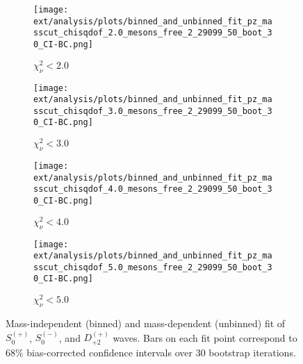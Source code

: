 \begin{figure}[htbp]
    \centering
    \begin{subfigure}{0.45\textwidth}
        \texttt{[image: ext/analysis/plots/binned\_and\_unbinned\_fit\_pz\_masscut\_chisqdof\_2.0\_mesons\_free\_2\_29099\_50\_boot\_30\_CI-BC.png]}
        \caption{$\chi^2_\nu < 2.0$}
    \end{subfigure}
    \hfill
    \begin{subfigure}{0.45\textwidth}
        \texttt{[image: ext/analysis/plots/binned\_and\_unbinned\_fit\_pz\_masscut\_chisqdof\_3.0\_mesons\_free\_2\_29099\_50\_boot\_30\_CI-BC.png]}
        \caption{$\chi^2_\nu < 3.0$}
    \end{subfigure}
    \vspace{1em}
    \begin{subfigure}{0.45\textwidth}
        \texttt{[image: ext/analysis/plots/binned\_and\_unbinned\_fit\_pz\_masscut\_chisqdof\_4.0\_mesons\_free\_2\_29099\_50\_boot\_30\_CI-BC.png]}
        \caption{$\chi^2_\nu < 4.0$}
    \end{subfigure}
    \hfill
    \begin{subfigure}{0.45\textwidth}
        \texttt{[image: ext/analysis/plots/binned\_and\_unbinned\_fit\_pz\_masscut\_chisqdof\_5.0\_mesons\_free\_2\_29099\_50\_boot\_30\_CI-BC.png]}
        \caption{$\chi^2_\nu < 5.0$}
    \end{subfigure}

    \caption{Mass-independent (binned) and mass-dependent (unbinned) fit of $S_{0}^{(+)}$, $S_{0}^{(-)}$, and $D_{+2}^{(+)}$ waves. Bars on each fit point correspond to $68\%$ bias-corrected confidence intervals over $ 30 $ bootstrap iterations.}
    \label{fig:unbinned-fit-all-Spn-D2p}
\end{figure}


